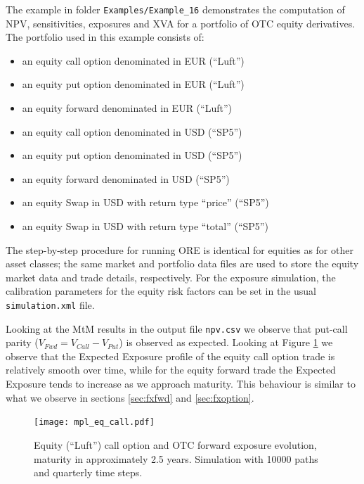 \documentclass[12pt, a4paper]{article}
\begin{document}
The example in folder {\tt Examples/Example\_16} demonstrates the computation of NPV, sensitivities, exposures and XVA for a portfolio 
of OTC equity derivatives. The portfolio used in this example consists of:

\begin{itemize}
	\item an equity call option denominated in EUR (``Luft'')
	\item an equity put option denominated in EUR (``Luft'')
	\item an equity forward denominated in EUR (``Luft'')
	\item an equity call option denominated in USD (``SP5'')
	\item an equity put option denominated in USD (``SP5'')
	\item an equity forward denominated in USD (``SP5'')
	\item an equity Swap in USD with return type  ``price'' (``SP5'')
	\item an equity Swap in USD with return type ``total'' (``SP5'')
\end{itemize}

The step-by-step procedure for running ORE is identical for equities as for other asset classes; the same market and 
portfolio data files are used to store the equity market data and trade details, respectively. For the exposure 
simulation, the calibration parameters for the equity risk factors can be set in the usual {\tt simulation.xml} file.

Looking at the MtM results in the output file {\tt npv.csv} we observe that put-call parity ($V_{Fwd} = V_{Call} - 
V_{Put}$) is observed as expected. Looking at Figure \ref{fig_eq_call} we observe that the Expected Exposure profile of 
the equity call option trade is relatively smooth over time, while for the equity forward trade the Expected Exposure 
tends to increase as we approach maturity. This behaviour is similar to what we observe in sections \ref{sec:fxfwd} 
and \ref{sec:fxoption}. 

\begin{figure}[h!]
	\begin{center}
		\texttt{[image: mpl\_eq\_call.pdf]}
	\end{center}
	\caption{Equity (``Luft'') call option and OTC forward exposure evolution, maturity in approximately 2.5 years. 
	Simulation with 
	10000 paths and quarterly time steps.}
	\label{fig_eq_call}
\end{figure}
\end{document}
